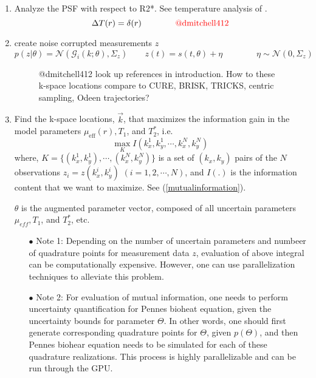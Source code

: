 \documentclass[10pt]{amsart}
\newcommand{\eqn}[1]{(\ref{#1})}
\newcommand{\picdir}{./pdffig}
\begin{document}
\begin{enumerate}
  \item Analyze the PSF with respect to  R2*. See temperature analysis of \cite{Odeen2014}.
      \[
        \Delta T (r) = \delta (r)
        \qquad \qquad
        \text{\color{red} @dmitchell412}
      \]
  \item create noise corrupted measurements $z$
     \[
      p(z|\theta) =  \mathcal{N}(\mathcal{G}_i(k;\theta),\Sigma_z)  
      \qquad
      z(t) = s(t,\theta) + \eta  
     \qquad \qquad 
      \eta \sim \mathcal{N} (0,\Sigma_z)
     \]
\begin{figure}[h]
\centering
{}
\caption{\color{red} 
         @dmitchell412 look up references in \cite{Odeen2014}  introduction.
  How to these k-space locations compare  to CURE, BRISK, TRICKS, centric
sampling, Odeen \cite{Odeen2014} trajectories?
}\label{kspacetrajectories}
\end{figure}
  \item Find the k-space locations, $\vec{k}$, that maximizes the information
gain in the model parameters $\mu_\text{eff}(r), T_1$, and $T_2^*$, i.e.
\begin{equation}\label{infocost}
\max_{K} I(k_x^1,k_y^1,\cdots,k_x^N,k_y^N)
\end{equation}
where, $K=\{(k_x^1,k_y^1),\cdots,(k_x^N,k_y^N)\}$ is a set of $(k_x,k_y)$
pairs of the $N$ observations $z_i=z(k_x^i,k_y^i)$ $(i=1,2,\cdots, N)$, and
$I(.)$ is the information content that we want to maximize.
See \eqn{mutualinformation}.

$\theta$ is the augmented parameter vector, composed of all uncertain
parameters $\mu_{eff}, T_1$, and $T_2^*$, etc.


\begin{itemize}
\item[$\bullet$] Note 1: Depending on the number of uncertain parameters and numbeer of quadrature points for measurement data $z$, evaluation of above integral can be computationally expensive. However, one can use parallelization techniques to alleviate this problem.

\item[$\bullet$] Note 2: For evaluation of mutual information, one needs to perform uncertainty quantification for Pennes bioheat equation, given the uncertainty bounds for parameter $\Theta$. In other words, one should first generate corresponding quadrature points for $\Theta$, given $p(\Theta)$, and then Pennes biohear equation needs to be simulated for each of these quadrature realizations. This process is highly parallelizable and can be run through the GPU.


\end{itemize}
\end{enumerate}
\end{document}

